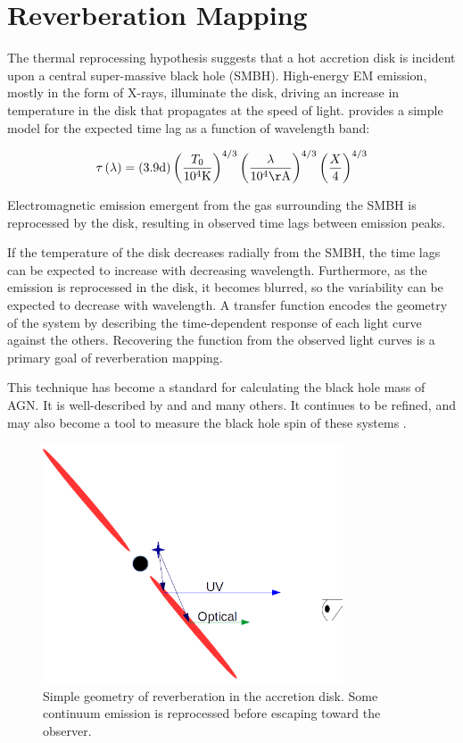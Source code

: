 \documentclass[11pt,letterpaper]{article}
\begin{document}
\section{Reverberation Mapping}
\label{reverbmap}
The thermal reprocessing hypothesis suggests that a hot accretion disk is incident upon a central super-massive black hole (SMBH). High-energy EM emission, mostly in the form of X-rays, illuminate the disk, driving an increase in temperature in the disk that propagates at the speed of light. \cite{1999MNRAS.302L..24C} provides a simple model for the expected time lag as a function of wavelength band:

\begin{equation}
    \tau\left(\lambda\right) = 
        \left(3.9 \textrm{d}\right) 
        \left(\frac{T_0}{10^4\mathrm{K}}\right)^{4/3}
        \left(\frac{\lambda}{10^4\mathrm{\AA}}\right)^{4/3}
        \left(\frac{X}{4}\right)^{4/3}
\end{equation}

Electromagnetic emission emergent from the gas surrounding the SMBH is reprocessed by the disk, resulting in observed time lags between emission peaks.


 If the temperature of the disk decreases radially from the SMBH, the time lags can be expected to increase with decreasing wavelength. Furthermore, as the emission is reprocessed in the disk, it becomes blurred, so the variability can be expected to decrease with wavelength. A transfer function encodes the geometry of the system by describing the time-dependent response of each light curve against the others. Recovering the function from the observed light curves is a primary goal of reverberation mapping.

This technique has become a standard for calculating the black hole mass of AGN. It is well-described by \cite{2007MNRAS.380..669C} and \cite{2014A&ARv..22...72U} and many others. It continues to be refined, and may also become a tool to measure the black hole spin of these systems \citep{2016Natur.535..388K}.

\begin{figure}
	\centering
	\includegraphics[width=3.5in]{../img/basic_geometry.png}
	\caption{Simple geometry of reverberation in the accretion disk. Some continuum emission is reprocessed before escaping toward the observer.}
\end{figure}
    
\end{document}
